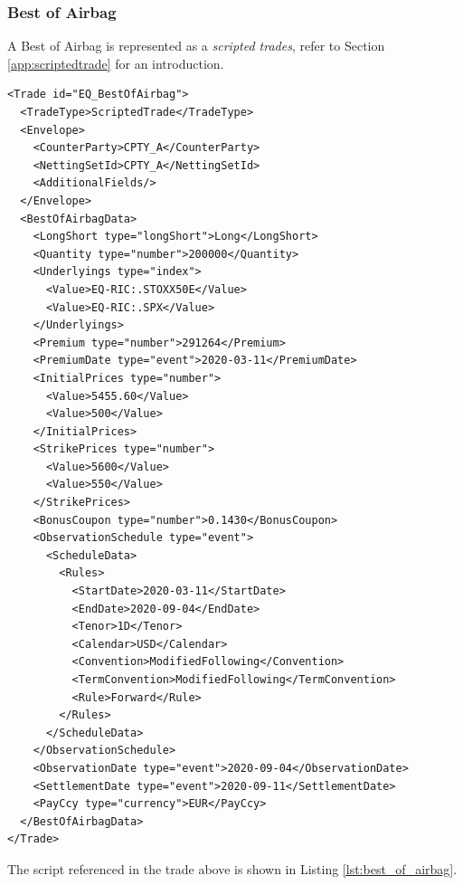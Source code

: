 \subsubsection{Best of Airbag}


A  Best of Airbag is represented as a {\em scripted trades}, refer to Section
\ref{app:scriptedtrade} for an introduction.

\begin{verbatim}
<Trade id="EQ_BestOfAirbag">
  <TradeType>ScriptedTrade</TradeType>
  <Envelope>
    <CounterParty>CPTY_A</CounterParty>
    <NettingSetId>CPTY_A</NettingSetId>
    <AdditionalFields/>
  </Envelope>
  <BestOfAirbagData>
    <LongShort type="longShort">Long</LongShort>
    <Quantity type="number">200000</Quantity>
    <Underlyings type="index">
      <Value>EQ-RIC:.STOXX50E</Value>
      <Value>EQ-RIC:.SPX</Value>
    </Underlyings>
    <Premium type="number">291264</Premium>
    <PremiumDate type="event">2020-03-11</PremiumDate>
    <InitialPrices type="number">
      <Value>5455.60</Value>
      <Value>500</Value>
    </InitialPrices>
    <StrikePrices type="number">
      <Value>5600</Value>
      <Value>550</Value>
    </StrikePrices>
    <BonusCoupon type="number">0.1430</BonusCoupon>
    <ObservationSchedule type="event">
      <ScheduleData>
        <Rules>
          <StartDate>2020-03-11</StartDate>
          <EndDate>2020-09-04</EndDate>
          <Tenor>1D</Tenor>
          <Calendar>USD</Calendar>
          <Convention>ModifiedFollowing</Convention>
          <TermConvention>ModifiedFollowing</TermConvention>
          <Rule>Forward</Rule>
        </Rules>
      </ScheduleData>
    </ObservationSchedule>
    <ObservationDate type="event">2020-09-04</ObservationDate>
    <SettlementDate type="event">2020-09-11</SettlementDate>
    <PayCcy type="currency">EUR</PayCcy>
  </BestOfAirbagData>
</Trade>
\end{verbatim}

The script referenced in the trade above is shown in Listing \ref{lst:best_of_airbag}.

